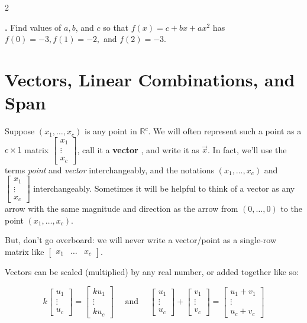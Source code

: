 \documentclass[11pt, letterpaper]{report}
\newcounter{exercise}[section]
\newcommand{\exatend}{\refstepcounter{exercise}\par%
\noindent\textbf{\theexercise.} }
\newcommand{\R}{\mathbb{R}}
\newcommand{\bbvec}[2]{
  \begin{bmatrix} #1 \\ #2 \end{bmatrix}
}
\newcommand{\bbbvec}[3]{
  \begin{bmatrix} #1 \\ #2 \\ #3 \end{bmatrix}
}
\begin{document}
\begin{multicols*}{2}
\exatend \label{exercise:1.2-28} Find values of $a,b$, and $c$ so that $f(x) = c + bx + ax^2$ has $f(0) = -3, f(1) = -2,$ and $f(2) = -3$.

\end{multicols*}

\section{Vectors, Linear Combinations, and Span}
\label{sec:vectors-linear-combinations-span}

Suppose $(x_1, \ldots, x_c)$ is any point in $\R^c$. We will often represent such a point as a $c \times 1$ matrix $\bbbvec{x_1}{\vdots}{x_c}$, call it a \textbf{vector} , and write it as $\vec{x}$. In fact, we'll use the terms \emph{point} and \emph{vector} interchangeably, and the notations $(x_1, \ldots, x_c)$ and $\bbbvec{x_1}{\vdots}{x_c}$ interchangeably. Sometimes it will be helpful to think of a vector as any arrow with the same magnitude and direction as the arrow from $(0, \ldots, 0)$ to the point $(x_1, \ldots, x_c)$.


But, don't go overboard: we will never write a vector/point as a single-row matrix like $
\begin{bmatrix}
x_1 & \ldots & x_c
\end{bmatrix}$.

Vectors can be scaled (multiplied) by any real number, or added together like so:

\[k\bbbvec{u_1}{\vdots}{u_c} = \bbbvec{ku_1}{\vdots}{ku_c} \quad \text{ and } \quad \bbbvec{u_1}{\vdots}{u_c} + \bbbvec{v_1}{\vdots}{v_c} = \bbbvec{u_1+v_1}{\vdots}{u_c+v_c} \]
\end{document}
